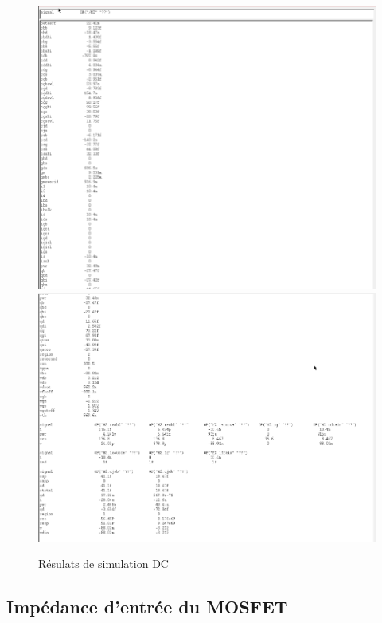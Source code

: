 \documentclass[a4paper]{article}
\begin{document}
\begin{figure}[!htb]
\begin{center}
  \includegraphics[scale=0.46]{Transistor-DC-1.png}
  \includegraphics[scale=0.40]{Transistor-DC-2.png}
  \caption{R\'esulats de simulation DC}
\end{center}
\end{figure}

\clearpage

\subsection{Imp\'edance d'entr\'ee du MOSFET}
\end{document}

